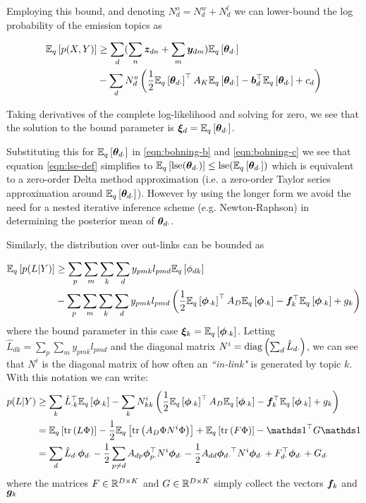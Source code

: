 Employing this bound, and denoting $N^o_d = N^w_d + N^l_d$ we can lower-bound the log probability of the emission topics as

\begin{equation}
\begin{aligned}
\ex{p(X,Y)}{q} & \geq \sum_d  (\sum_n \vv{z}_{dn} + \sum_m \vv{y}_{dm}) \ex{\thdo}{q} \\
   & - \sum_d N^o_d \left(\half \ex{\thdo}{q}\T A_K \ex{\thdo}{q} - \vv{b}_d\T\ex{\thdo}{q} + c_d\right)
\end{aligned}
\end{equation}

Taking derivatives of the complete log-likelihood and solving for zero, we see that the solution to the bound parameter is $\Ed = \ex{\thdo}{q}$. 

Substituting this for $\ex{\thdo}{q}$ in \eqref{eqn:bohning-b} and \eqref{eqn:bohning-c} we see that equation \eqref{eqn:lse-def} simplifies to $\ex{\lse(\thdo)}{q} \leq \lse(\ex{\thdo}{q})$ which is equivalent to a zero-order Delta method approximation (i.e. a zero-order Taylor series approximation around $\ex{\thdo}{q}$). However by using the longer form we avoid the need for a nested iterative inference scheme (e.g. Newton-Raphson) in determining the posterior mean of $\thdo$.

Similarly, the distribution over out-links can be bounded as

\begin{align}
\ex{p(L|Y)}{q} & \geq \sum_p \sum_m \sum_k \sum_d y_{pmk} l_{pmd} \ex{\phi_{dk}}{q} \\
 & - \sum_p \sum_m \sum_k \sum_d y_{pmk} l_{pmd} \left(\half \ex{\phok}{q}\T A_D \ex{\phok}{q} - \vv{f}_k\T \ex{\phok}{q} + g_k\right)
\end{align}
where the bound parameter in this case $\vv{\xi}_k = \ex{\phok}{q}$. Letting $\hat{L}_{dk} = \sum_p \sum_m y_{pmk} l_{pmd}$ and the diagonal matrix $N^i = \diag{\sum_d \hat{L}_{d\cdot}}$, we can see that $N^i$ is the diagonal matrix of how often an \emph{``in-link"} is generated by topic $k$. With this notation we can write:
\begin{align}
p(L|Y) & \geq \sum_k \hat{L}_{\cdot k}\T \ex{\phok}{q} - \sum_k N^i_{kk} \left(\half \ex{\phok}{q}\T A_D \ex{\phok}{q} - \vv{f}_k\T \ex{\phok}{q} + g_k\right) \\
& = \ex{\Tr{L \Phi}}{q} - \half \ex{\Tr{A_D \Phi N^i \Phi}}{q} + \ex{\Tr{F \Phi}}{q} - \one\T G \one \\
& = \sum_d \hat{L}_{d\cdot} \phdo - \half \sum_{p \neq d} A_{dp} \vv{\phi}_{p\cdot}\T N^i \phdo -\half A_{dd} \phdo\T N^i \phdo + F_{d\cdot}\T\phdo + G_{d\cdot}
\end{align}
where the matrices $F \in \MReal{D}{K}$ and $G \in \MReal{D}{K}$ simply collect the vectors $\vv{f}_k$ and $\vv{g}_k$

